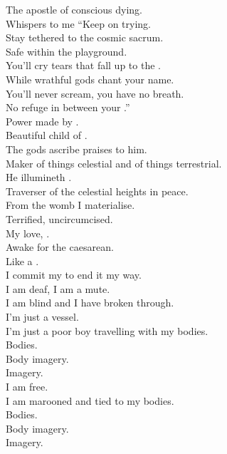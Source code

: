 

The apostle of conscious dying. \\
Whispers to me ``Keep on trying. \\
Stay tethered to the cosmic sacrum. \\
Safe within the  playground. \\
You'll cry tears that fall up to the . \\
While wrathful gods chant your name. \\
You'll never scream, you have no breath. \\
No refuge in between your .'' \\

Power made by . \\
Beautiful child of . \\
The gods ascribe praises to him. \\
Maker of things celestial and of things terrestrial. \\
He illumineth . \\
Traverser of the celestial heights in peace. \\

From the womb I materialise. \\
Terrified, uncircumcised. \\
My  love, . \\
Awake for the caesarean. \\
Like a . \\
I commit my  to end it my way. \\
I am deaf, I am a mute. \\
I am blind and I have broken through. \\

I'm just a vessel. \\
I'm just a poor boy travelling with my bodies. \\
Bodies. \\
Body imagery. \\
Imagery. \\
I am free. \\
I am marooned and tied to my bodies. \\
Bodies. \\
Body imagery. \\
Imagery. \\

